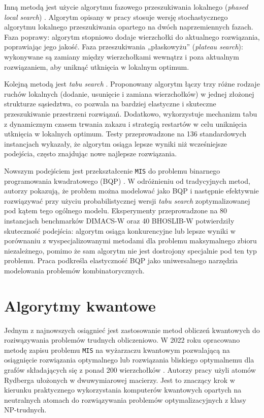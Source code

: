 \documentclass[12pt]{article}
\begin{document}
Inną metodą jest użycie algorytmu fazowego przeszukiwania lokalnego (\textit{phased local search}) \cite{pullan2009optimisation}. Algorytm opisany w pracy stosuje wersję stochastycznego algorytmu lokalnego przeszukiwania opartego na dwóch naprzemiennych fazach. Faza poprawy: algorytm stopniowo dodaje wierzchołki do aktualnego rozwiązania, poprawiając jego jakość. Faza przeszukiwania „płaskowyżu” (\textit{plateau search}): wykonywane są zamiany między wierzchołkami wewnątrz i poza aktualnym rozwiązaniem, aby uniknąć utknięcia w lokalnym optimum.

Kolejną metodą jest \textit{tabu search} \cite{wu2012multi}. Proponowany algorytm łączy trzy różne rodzaje ruchów lokalnych (dodanie, usunięcie i zamiana wierzchołków) w jednej złożonej strukturze sąsiedztwa, co pozwala na bardziej elastyczne i skuteczne przeszukiwanie przestrzeni rozwiązań. Dodatkowo, wykorzystuje mechanizm tabu z dynamicznym czasem trwania zakazu i strategią restartów w celu uniknięcia utknięcia w lokalnych optimum. Testy przeprowadzone na 136 standardowych instancjach wykazały, że algorytm osiąga lepsze wyniki niż wcześniejsze podejścia, często znajdując nowe najlepsze rozwiązania.

Nowszym podejściem jest przekształcenie \texttt{MIS} do problemu binarnego programowania kwadratowego (BQP) \cite{wang2016solving}. W odróżnieniu od tradycyjnych metod, autorzy pokazują, że problem można modelować jako BQP i następnie efektywnie rozwiązywać przy użyciu probabilistycznej wersji \textit{tabu search} zoptymalizowanej pod kątem tego ogólnego modelu. Eksperymenty przeprowadzone na 80 instancjach benchmarków DIMACS-W oraz 40 BHOSLIB-W potwierdziły skuteczność podejścia: algorytm osiąga konkurencyjne lub lepsze wyniki w porównaniu z wyspecjalizowanymi metodami dla problemu maksymalnego zbioru niezależnego, pomimo że sam algorytm nie jest dostrojony specjalnie pod ten typ problemu. Praca podkreśla elastyczność BQP jako uniwersalnego narzędzia modelowania problemów kombinatorycznych.

\section{Algorytmy kwantowe}

Jednym z najnowszych osiągnieć jest zastosowanie metod obliczeń kwantowych do roziwązywania problemów trudnych obliczeniowo. W 2022 roku opracowano metodę zapisu problemu \texttt{MIS} na wyżarzaczu kwantowym pozwalającą na osiągnięcie rozwiązania optymalnego lub rozwiązania bliskiego optymalnemu dla grafów składających się z ponad 200 wierzchołków \cite{ebadi2022quantum}. Autorzy pracy użyli atomów Rydberga ułożonych w dwuwymiarowej macierzy. Jest to znaczący krok w kierunku praktycznego wykorzystania komputerów kwantowych opartych na neutralnych atomach do rozwiązywania problemów optymalizacyjnych z klasy NP-trudnych.

\newpage



\end{document}
